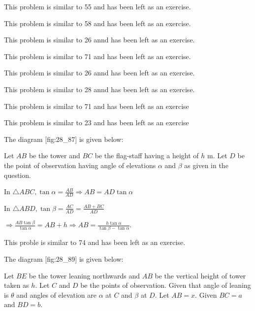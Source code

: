 \item This problem is similar to 55 and has been left as an exercise.

\item This problem is similar to 58 and has been left as an exercise.

\item This problem is similar to 26 annd has been left as an exercise.

\item This problem is similar to 71 and has been left as an exercise.

\item This problem is similar to 26 annd has been left as an exercise.

\item This problem is similar to 28 annd has been left as an exercise.

\item This problem is similar to 71 and has been left as an exercise

\item This problem is similar to 23 and has been left as an exercise

\item The diagram [fig:28_87] is given below:

  \startplacefigure[reference=fig:28_87]
    \externalfigure[28_87.pdf]
  \stopplacefigure

  Let $AB$ be the tower and $BC$ be the flag-staff having a height of $h$ m. Let $D$ be the point of
  observation having angle of elevations $\alpha$ and $\beta$ as given in the question.

  In $\triangle ABC, \tan\alpha = \frac{AB}{AD} \Rightarrow AB = AD\tan\alpha$

  In $\triangle ABD, \tan\beta = \frac{AC}{AD} = \frac{AB + BC}{AD}$

  $\Rightarrow \frac{AB\tan\beta}{\tan\alpha} = AB + h \Rightarrow AB = \frac{h\tan\alpha}{\tan\beta - \tan\alpha}.$

\item This proble is similar to 74 and has been left as an exercise.

\item The diagram [fig:28_89] is given below:

  \startplacefigure[reference=fig:28_89]
    \externalfigure[28_89.pdf]
  \stopplacefigure

  Let $BE$ be the tower leaning northwards and $AB$ be the vertical height of tower taken as $h$. Let $C$
  and $D$ be the points of observation. Given that angle of leaning is $\theta$ and angles of elevation are
  $\alpha$ at $C$ and $\beta$ at $D$. Let $AB = x$. Given $BC = a$ and $BD = b$.

